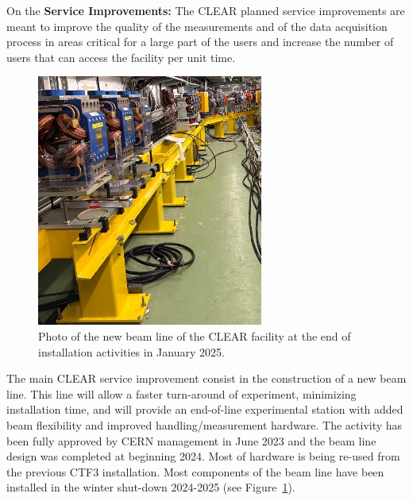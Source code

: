 {On the \textbf{Service Improvements:}
The CLEAR planned service improvements are meant to improve the quality of the measurements and of the data acquisition process in areas critical for a large part of the users and increase the number of users that can access the facility per unit time. 
\begin{figure}[H]
    \centering
    \includegraphics[width=0.60\linewidth]{graphics/CLEAR-2ndBLJan25.jpg}
    \caption{%
    Photo of the new beam line of the CLEAR facility at the end of installation activities in January 2025.}
    \label{fig:wp3-clear-2ndbl-inst}
\end{figure}

The main CLEAR service improvement consist in the construction of a new beam line. This line will allow a faster turn-around of experiment, minimizing installation time, and will provide an end-of-line experimental station with added beam flexibility and improved handling/measurement hardware. The activity has been fully approved by CERN management in June 2023 and the beam line design was completed at beginning 2024. Most of hardware is being re-used from the previous CTF3 installation. Most components of the beam line have been installed in the winter shut-down 2024-2025 (see Figure~\ref{fig:wp3-clear-2ndbl-inst}).

}
